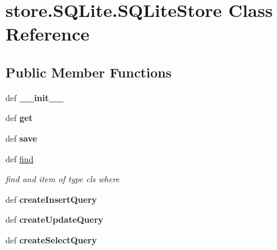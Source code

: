 \hypertarget{classstore_1_1_s_q_lite_1_1_s_q_lite_store}{\section{store.\-S\-Q\-Lite.\-S\-Q\-Lite\-Store Class Reference}
\label{classstore_1_1_s_q_lite_1_1_s_q_lite_store}
}
\subsection*{Public Member Functions}
\begin{DoxyCompactItemize}
\item 
\hypertarget{classstore_1_1_s_q_lite_1_1_s_q_lite_store_a276787270f7de13eb0b4b56b0d327885}{def {\bfseries \-\_\-\-\_\-init\-\_\-\-\_\-}}\label{classstore_1_1_s_q_lite_1_1_s_q_lite_store_a276787270f7de13eb0b4b56b0d327885}

\item 
\hypertarget{classstore_1_1_s_q_lite_1_1_s_q_lite_store_a717da5c6262f488c658bef4ce6947455}{def {\bfseries get}}\label{classstore_1_1_s_q_lite_1_1_s_q_lite_store_a717da5c6262f488c658bef4ce6947455}

\item 
\hypertarget{classstore_1_1_s_q_lite_1_1_s_q_lite_store_adc6d29c31138f837050d3b1715f605f4}{def {\bfseries save}}\label{classstore_1_1_s_q_lite_1_1_s_q_lite_store_adc6d29c31138f837050d3b1715f605f4}

\item 
\hypertarget{classstore_1_1_s_q_lite_1_1_s_q_lite_store_a85f6f921d76f226b7cff93aa099690f2}{def \hyperlink{classstore_1_1_s_q_lite_1_1_s_q_lite_store_a85f6f921d76f226b7cff93aa099690f2}{find}}\label{classstore_1_1_s_q_lite_1_1_s_q_lite_store_a85f6f921d76f226b7cff93aa099690f2}

\begin{DoxyCompactList}\small\item\em find and item of type cls where \end{DoxyCompactList}\item 
\hypertarget{classstore_1_1_s_q_lite_1_1_s_q_lite_store_abb222c51c20ae426281f0faec9ae843d}{def {\bfseries create\-Insert\-Query}}\label{classstore_1_1_s_q_lite_1_1_s_q_lite_store_abb222c51c20ae426281f0faec9ae843d}

\item 
\hypertarget{classstore_1_1_s_q_lite_1_1_s_q_lite_store_a12c8e724ba2f450a418b37658c8ab809}{def {\bfseries create\-Update\-Query}}\label{classstore_1_1_s_q_lite_1_1_s_q_lite_store_a12c8e724ba2f450a418b37658c8ab809}

\item 
\hypertarget{classstore_1_1_s_q_lite_1_1_s_q_lite_store_a7f70f1ba13fd45edaab56d44d303b087}{def {\bfseries create\-Select\-Query}}\label{classstore_1_1_s_q_lite_1_1_s_q_lite_store_a7f70f1ba13fd45edaab56d44d303b087}

\end{DoxyCompactItemize}
